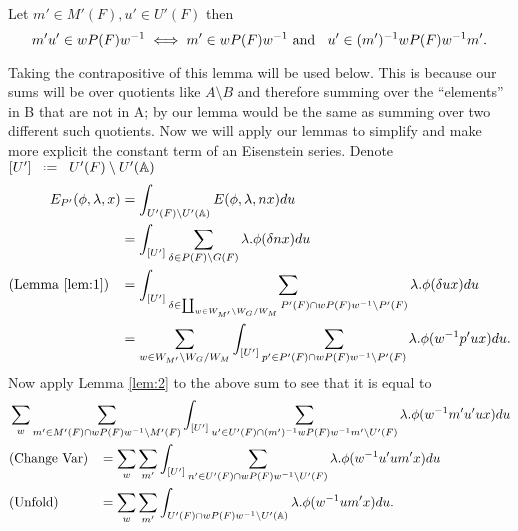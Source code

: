     \begin{Lemma}\label{lem:2}
        Let \(m'\in M'(F),  u'\in U'(F)\) then 
        \[m'u' \in wP(F)w^{-1} \iff m'\in wP(F)w^{-1} \text{ and  }\;\; u'\in (m')^{-1} wP(F)w^{-1} m'.\]
    \end{Lemma}
    Taking the contrapositive of this lemma will be used below. This is because our sums will be over quotients like \(A\setminus B\) and therefore summing over the ``elements'' in B that are not in A; by our lemma would be the same as summing over two different such quotients.
Now we will apply our lemmas to simplify and make more explicit the constant term of an Eisenstein series. Denote \([U']\defeq U'(F)\setminus U'(\A)\)
    \begin{equation*}
        \begin{aligned}
            E_{P'}( \phi, \lambda, x) &= \int_{U'(F)\setminus U'(\A)} E( \phi, \lambda, nx) du\\
                                     &= \int_{[U']} \sum_{\delta\in P(F)\setminus G(F)} \lambda.\phi(\delta nx)  du\\
                                    (\text{Lemma }\ref{lem:1}) \;\;\; &= \int_{[U']} \sum_{\delta\in \coprod_{w\in W_{M'}\setminus W_G / W_{M}} P'(F)\cap wP(F)w\inv \setminus P'(F)} \lambda.\phi(\delta ux)  du\\
                                     &= \sum_{ w\in W_{M'}\setminus W_G / W_{M}}\int_{[U']} \sum_{p'\in P'(F)\cap wP(F)w\inv \setminus P'(F)} \lambda.\phi( w\inv p'ux)  du.\\
        \end{aligned}
    \end{equation*}
    Now apply Lemma \ref{lem:2} to the above sum to see that it is equal to 
    \begin{align*}
    	&\sum_{ w} \sum_{m'\in M'(F)\cap wP(F)w\inv\setminus M'(F)} \int_{[U']} \sum_{u'\in U'(F)\cap (m')\inv wP(F)w\inv m' \setminus U'(F)} \lambda.\phi( w\inv m'u'ux)  du\\
    	&(\text{Change Var}) \;\;\; = \sum_{ w} \sum_{m'} \int_{[U']} \sum_{n'\in U'(F)\cap wP(F)w\inv\setminus U'(F) } \lambda.\phi( w\inv u'um'x)  du\\
    	&(\text{Unfold}) \;\;\;\;\;\;\;\;\;\;\; = \sum_{ w} \sum_{m'} \int_{U'(F)\cap wP(F)w\inv \setminus U'(\A)} \lambda.\phi( w\inv um' x)  du.\\
    \end{align*}

